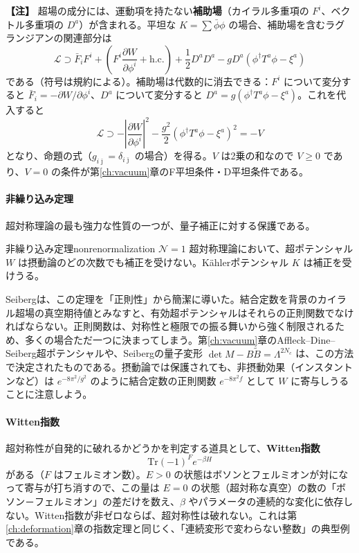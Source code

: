 \documentclass[uplatex, dvipdfmx, book]{jsbook}
\newenvironment{note}{\vspace{1ex}\par\footnotesize\noindent\textbf{【注】}}{\par\vspace{1ex}}
\begin{document}
\begin{note}
超場の成分には、運動項を持たない\textbf{補助場}（カイラル多重項の $F^i$、ベクトル多重項の $D^a$）が含まれる。平坦な $K = \sum\bar\phi\phi$ の場合、補助場を含むラグランジアンの関連部分は
\begin{equation*}
    \mathcal{L} \supset \bar{F}_i F^i + \left( F^i \frac{\partial W}{\partial\phi^i} + \text{h.c.} \right) + \frac{1}{2}D^aD^a - g D^a\left( \phi^\dagger T^a\phi - \xi^a \right)
\end{equation*}
である（符号は規約による）。補助場は代数的に消去できる：$F^i$ について変分すると $\bar{F}_i = -\partial W/\partial\phi^i$、$D^a$ について変分すると $D^a = g(\phi^\dagger T^a\phi - \xi^a)$。これを代入すると
\begin{equation*}
    \mathcal{L} \supset -\left|\frac{\partial W}{\partial\phi^i}\right|^2 - \frac{g^2}{2}\left( \phi^\dagger T^a\phi - \xi^a \right)^2 = -V
\end{equation*}
となり、命題の式（$g_{i\bar\jmath} = \delta_{i\bar\jmath}$ の場合）を得る。$V$ は2乗の和なので $V \ge 0$ であり、$V = 0$ の条件が第\ref{ch:vacuum}章のF平坦条件・D平坦条件である。
\end{note}

\paragraph{非繰り込み定理}
超対称理論の最も強力な性質の一つが、量子補正に対する保護である。

\begin{mythm}{非繰り込み定理}{nonrenormalization}
$\mathcal{N} = 1$ 超対称理論において、超ポテンシャル $W$ は摂動論のどの次数でも補正を受けない。K\"ahlerポテンシャル $K$ は補正を受けうる。
\end{mythm}

Seibergは、この定理を「正則性」から簡潔に導いた\cite{seiberg1994}。結合定数を背景のカイラル超場の真空期待値とみなすと、有効超ポテンシャルはそれらの正則関数でなければならない。正則関数は、対称性と極限での振る舞いから強く制限されるため、多くの場合ただ一つに決まってしまう。第\ref{ch:vacuum}章のAffleck--Dine--Seiberg超ポテンシャルや、Seibergの量子変形 $\det M - B\tilde{B} = \Lambda^{2N_c}$ は、この方法で決定されたものである。摂動論では保護されても、非摂動効果（インスタントンなど）は $e^{-8\pi^2/g^2}$ のように結合定数の正則関数 $e^{-8\pi^2 f}$ として $W$ に寄与しうることに注意しよう。

\paragraph{Witten指数}
超対称性が自発的に破れるかどうかを判定する道具として、\textbf{Witten指数}
\begin{equation}
    \mathrm{Tr}(-1)^F e^{-\beta H}
\end{equation}
がある（$F$ はフェルミオン数）。$E > 0$ の状態はボソンとフェルミオンが対になって寄与が打ち消すので、この量は $E = 0$ の状態（超対称な真空）の数の「ボソン－フェルミオン」の差だけを数え、$\beta$ やパラメータの連続的な変化に依存しない。Witten指数が非ゼロならば、超対称性は破れない。これは第\ref{ch:deformation}章の指数定理と同じく、「連続変形で変わらない整数」の典型例である。
\end{document}

